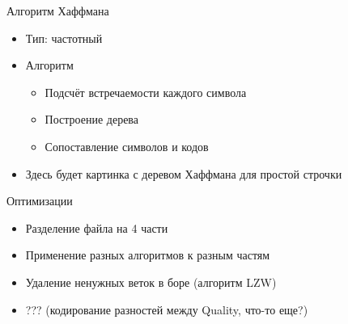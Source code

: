 \documentclass[12pt]{beamer}
\begin{document}
\begin{frame}{Алгоритм Хаффмана}

    \begin{itemize}

        \item Тип: частотный
        
        \item Алгоритм
        
        \begin{itemize}

            \item <1-> Подсчёт встречаемости каждого символа

            \item <2-> Построение дерева

            \item <3-> Сопоставление символов и кодов

        \end{itemize}

        \item Здесь будет картинка с деревом Хаффмана для простой строчки  

    \end{itemize}

\end{frame}

\begin{frame}{Оптимизации}

    \begin{itemize}

        \item <1-> Разделение файла на 4 части

        \item <2-> Применение разных алгоритмов к разным частям 

        \item <3-> Удаление ненужных веток в боре (алгоритм LZW)

        \item <4-> ??? (кодирование разностей между Quality, что-то еще?)
    
    \end{itemize} 

\end{frame}
\end{document}
